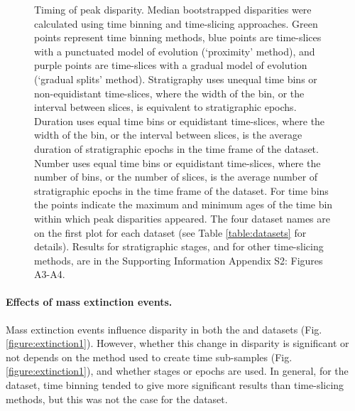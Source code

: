 \documentclass[12pt,a4paper]{article}
\begin{document}
\begin{figure}[!htbp]
    \centering
    \caption[Timing of peak disparity for four example datasets.]
    {Timing of peak disparity.
    Median bootstrapped disparities were calculated using time binning and time-slicing approaches. 
    Green points represent time binning methods, blue points are time-slices with a punctuated model of evolution (`proximity' method), and purple points are time-slices with a gradual model of evolution (`gradual splits' method). 
    Stratigraphy uses unequal time bins or non-equidistant time-slices, where the width of the bin, or the interval between slices, is equivalent to stratigraphic epochs. 
    Duration uses equal time bins or equidistant time-slices, where the width of the bin, or the interval between slices, is the average duration of stratigraphic epochs in the time frame of the dataset. 
    Number uses equal time bins or equidistant time-slices, where the number of bins, or the number of slices, is the average number of stratigraphic epochs in the time frame of the dataset. 
    For time bins the points indicate the maximum and minimum ages of the time bin within which peak disparities appeared.
    The four dataset names are on the first plot for each dataset (see Table \ref{table:datasets} for details).
    Results for stratigraphic stages, and for other time-slicing methods, are in the Supporting Information Appendix S2: Figures A3-A4.}
    \label{figure:peak1}
\end{figure}

\paragraph{Effects of mass extinction events.}
Mass extinction events influence disparity in both the \cite{beckancient2014} and \cite{wright2017bayesian} datasets (Fig. \ref{figure:extinction1}).
However, whether this change in disparity is significant or not depends on the method used to create time sub-samples (Fig. \ref{figure:extinction1}), and whether stages or epochs are used. 
In general, for the \cite{beckancient2014} dataset, time binning tended to give more significant results than time-slicing methods, but this was not the case for the \cite{wright2017bayesian} dataset.
\end{document}
